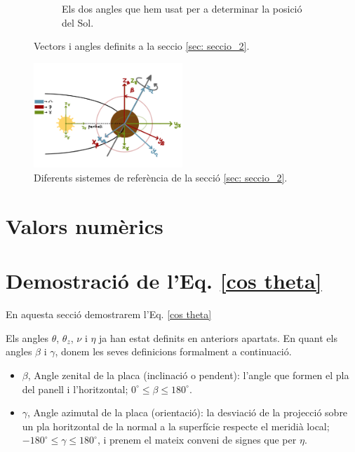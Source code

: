 \documentclass[11pt]{article}
\begin{document}
\begin{figure}[hbt]
\begin{subfigure}{0.5\textwidth}
        \caption{Els dos angles que hem usat per a determinar la posició del Sol.}
        \label{fig: sist_sol}
    \end{subfigure}
\label{fig: sistemes1}
\caption{Vectors i angles definits a la seccio \ref{sec: seccio_2}.}
\end{figure}

\begin{figure}[hbt]
    \centering
    \includegraphics[width=0.5\textwidth]{sist_ref.PNG}
    \caption{Diferents sistemes de referència de la secció \ref{sec: seccio_2}.}
    \label{fig: sist_ref}
\end{figure}

\section{Valors numèrics}
\label{sec: valors numerics}
\section{Demostració de l'Eq. \eqref{cos theta}}
\label{sec: demo cos theta}
En aquesta secció demostrarem l'Eq. \eqref{cos theta}

Els angles $\theta$, $\theta_z$, $\nu$ i $\eta$ ja han estat definits en anteriors apartats. En quant els angles $\beta$ i $\gamma$, donem les seves definicions formalment a continuació.
\begin{itemize}
    \item $\beta$, Angle zenital de la placa (inclinació o pendent): l'angle que formen el pla del panell i l'horitzontal; $0^\circ \leq \beta \leq 180^\circ$.
    \item $\gamma$, Angle azimutal de la placa (orientació): la desviació de la projecció sobre un pla horitzontal de la normal a la superfície respecte el meridià local; $-180^\circ \leq \gamma \leq 180^\circ$, i prenem el mateix conveni de signes que per $\eta$.
\end{itemize}
\end{document}

